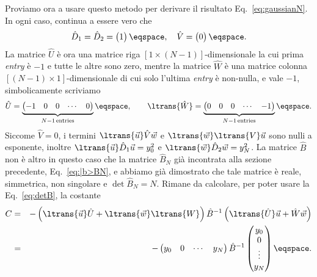 Proviamo ora a usare questo metodo per derivare il risultato
Eq.~\eqref{eq:gaussianN}.
In ogni caso, continua a essere vero che 
\begin{displaymath}
\hat{D}_{1} = \hat{D}_{2} = \begin{pmatrix} 1 \end{pmatrix} \eqspace, \quad 
\hat{V} =\begin{pmatrix} 0 \end{pmatrix} \eqspace .
\end{displaymath}
La matrice $\hat{U}$ \`e ora una matrice riga $[1\times (N-1)]$-dimensionale la cui prima
\emph{entry} \`e $-1$ e tutte le altre sono zero,  mentre la matrice $\hat{W}$
\`e una matrice colonna $[(N-1)\times 1 ]$-dimensionale di cui solo l'ultima
\emph{entry} \`e non-nulla, e vale $-1$, simbolicamente scriviamo
\begin{displaymath}
\hat{U} = \underbrace{\begin{pmatrix} -1 & 0 & 0 & \cdots & 0
\end{pmatrix}}_{N-1 \, \textrm{entries}} \eqspace, \qquad  
\ltrans{\hat{W}}= 
\underbrace{\begin{pmatrix} 0 & 0 & 0 &\cdots &  -1 \end{pmatrix}}_{N-1 \,
\textrm{entries}} \eqspace .
\end{displaymath}
Siccome $\hat{V} = 0$, 
 i termini $\ltrans{\vec{u}} \hat{V} \vec{w}$ e  $\ltrans{\vec{w}} \ltrans{V}
\vec{u}$ sono nulli a esponente, inoltre $\ltrans{\vec{u}} \hat{D}_{1} \vec{u} =
y_{0}^{2}$ e $\ltrans{\vec{w}} \hat{D}_{2} \vec{w} = y_{N}^{2}$.
La matrice $\hat{B}$ non \`e altro in questo caso che la matrice $\hat{B}_{N}$
gi\`a incontrata alla sezione precedente, Eq.~\eqref{eq:|b>BN}, e abbiamo gi\`a
dimostrato  che tale matrice \`e reale, simmetrica, non singolare e  $\det
\hat{B}_{N} = N$.
Rimane da calcolare, per poter usare la Eq.~\eqref{eq:detB}, la costante 
\begin{eqnarray*}
C &=&
- \left( \ltrans{\vec{u}} \hat{U} + \ltrans{\vec{w}} \ltrans{W} \right)
\hat{B}^{-1} \left( 
\ltrans{\hat{U}}\vec{u} +\hat{W} \vec{w} \right)  \\
&=& 
- \begin{pmatrix}  y_{0} & 0 & \cdots & y_{N} \end{pmatrix} \hat{B}^{-1} 
\begin{pmatrix} y_{0} \\ 0 \\  \vdots \\ y_{N} \end{pmatrix} \eqspace .
\end{eqnarray*}
